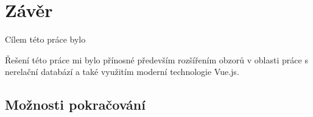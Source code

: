 \chapter{Závěr}
Cílem této práce bylo \blindtext

\blindtext %

Řešení této práce mi bylo přínosné především rozšířením obzorů v oblasti práce s nerelační databází a také využitím moderní technologie Vue.js.

\section{Možnosti pokračování}
\blindtext